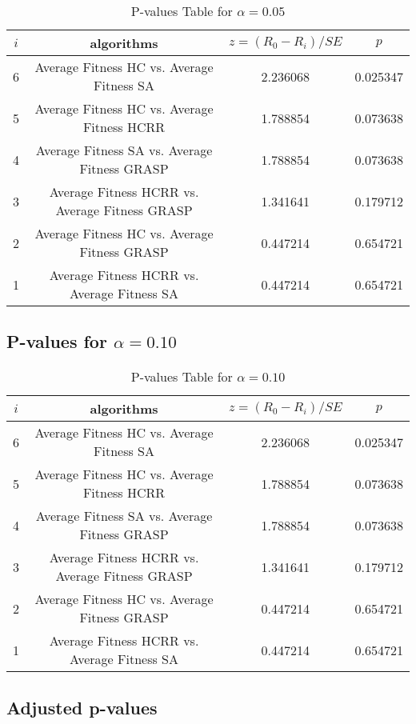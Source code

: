 \documentclass[a4paper,10pt]{article}
\begin{document}
\begin{landscape}
\begin{table}[!htp]
\centering\scriptsize
\begin{tabular}{cccc}
$i$&algorithms&$z=(R_0 - R_i)/SE$&$p$\\
\hline6&Average Fitness HC     vs. Average Fitness SA  &2.236068&0.025347\\
5&Average Fitness HC     vs. Average Fitness HCRR   &1.788854&0.073638\\
4&Average Fitness SA   vs. Average Fitness GRASP&1.788854&0.073638\\
3&Average Fitness HCRR    vs. Average Fitness GRASP&1.341641&0.179712\\
2&Average Fitness HC     vs. Average Fitness GRASP&0.447214&0.654721\\
1&Average Fitness HCRR    vs. Average Fitness SA  &0.447214&0.654721\\
\hline
\end{tabular}
\caption{P-values Table for $\alpha=0.05$}
\end{table}\pagebreak

\subsection{P-values for $\alpha=0.10$}

\begin{table}[!htp]
\centering\scriptsize
\begin{tabular}{cccc}
$i$&algorithms&$z=(R_0 - R_i)/SE$&$p$\\
\hline6&Average Fitness HC     vs. Average Fitness SA  &2.236068&0.025347\\
5&Average Fitness HC     vs. Average Fitness HCRR   &1.788854&0.073638\\
4&Average Fitness SA   vs. Average Fitness GRASP&1.788854&0.073638\\
3&Average Fitness HCRR    vs. Average Fitness GRASP&1.341641&0.179712\\
2&Average Fitness HC     vs. Average Fitness GRASP&0.447214&0.654721\\
1&Average Fitness HCRR    vs. Average Fitness SA  &0.447214&0.654721\\
\hline
\end{tabular}
\caption{P-values Table for $\alpha=0.10$}
\end{table}\pagebreak

\subsection{Adjusted p-values}


\end{landscape}
\end{document}
